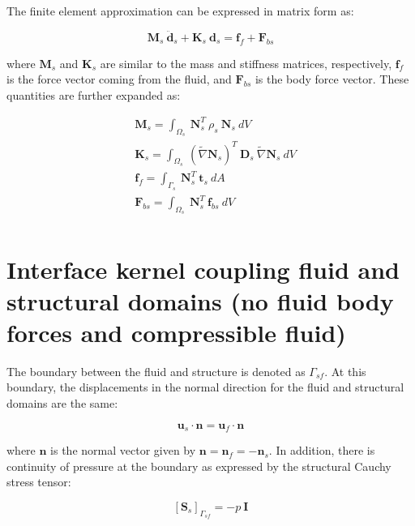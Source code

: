 \documentclass[3p]{elsarticle}
\begin{document}
\noindent The finite element approximation can be expressed in matrix form as:

\begin{equation}
    \label{eqn:Str_10}
    \mathbf{M}_s~\ddot{\mathbf{d}}_s + \mathbf{K}_s~\mathbf{d}_s = \mathbf{f}_f + \mathbf{F}_{bs}
\end{equation}

\noindent where $\mathbf{M}_s$ and $\mathbf{K}_s$ are similar to the mass and stiffness matrices, respectively, $\mathbf{f}_f$ is the force vector coming from the fluid, and $\mathbf{F}_{bs}$ is the body force vector. These quantities are further expanded as:

\begin{equation}
    \label{eqn:Str_11}
    \begin{aligned}
    &\mathbf{M}_s = \int_{\Omega_s}~\mathbf{N}_s^T~\rho_s~\mathbf{N}_s~dV\\
    &\mathbf{K}_s = \int_{\Omega_s}~(\widetilde{\nabla}\mathbf{N}_s)^T~ \mathbf{D}_s~\widetilde{\nabla}\mathbf{N}_s~dV\\
    &\mathbf{f}_f = \int_{\Gamma_s}~\mathbf{N}_s^T~\mathbf{t}_s~dA\\
    &\mathbf{F}_{bs} = \int_{\Omega_s}~\mathbf{N}_s^T~\mathbf{f}_{bs}~dV\\
    \end{aligned}
\end{equation}

\section{Interface kernel coupling fluid and structural domains (no fluid body forces and compressible fluid)}

\noindent The boundary between the fluid and structure is denoted as $\Gamma_{sf}$. At this boundary, the displacements in the normal direction for the fluid and structural domains are the same:

\begin{equation}
    \label{eqn:Int_1}
    \mathbf{u}_s \cdot \mathbf{n} = \mathbf{u}_f \cdot \mathbf{n}
\end{equation}

\noindent where $\mathbf{n}$ is the normal vector given by $\mathbf{n} = \mathbf{n}_f = -\mathbf{n}_s$. In addition, there is continuity of pressure at the boundary as expressed by the structural Cauchy stress tensor:

\begin{equation}
\label{eqn:Int_2}
    [\mathbf{S}_s]_{\Gamma_{sf}}=-p~\mathbf{I}
\end{equation}
\end{document}
